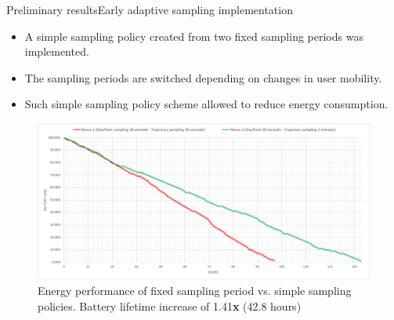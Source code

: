 \documentclass[8pt,xcolor={dvipsnames},handout]{beamer}
\begin{document}
\begin{frame}{Preliminary results}{Early adaptive sampling implementation}
\small{}
\begin{itemize}
  \item A simple sampling policy created from two fixed sampling periods was implemented.
  \item The sampling periods are switched depending on changes in user mobility.
  \item Such simple sampling policy scheme allowed to reduce energy consumption.
\end{itemize}

  \begin{figure}
  \centering
  \includegraphics[width=\columnwidth]{vectors/energy-performance-early-integral-test}
  \caption{Energy performance of fixed sampling period vs. simple sampling policies. Battery lifetime increase of 1.41\textbf{x} (42.8 hours)}
  \label{fig:energy-performance-early-integral-test}
\end{figure}
\end{frame}



\end{document}
